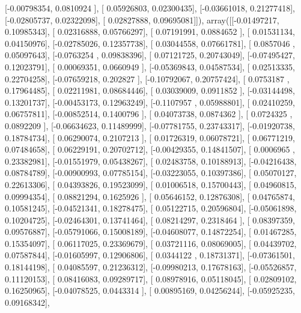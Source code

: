 \documentclass{article}
\begin{document}
       [-0.00798354,  0.0810924 ],
       [ 0.05926803,  0.02300435],
       [-0.03661018,  0.21277418],
       [-0.02805737,  0.02322098],
       [ 0.02827888,  0.09695081]]), array([[-0.01497217,  0.10985343],
       [ 0.02316888,  0.05766297],
       [ 0.07191991,  0.0884652 ],
       [ 0.01531134,  0.04150976],
       [-0.02785026,  0.12357738],
       [ 0.03044558,  0.07661781],
       [ 0.0857046 ,  0.05097643],
       [-0.0763254 ,  0.09838396],
       [ 0.07121725,  0.20743049],
       [-0.07495427,  0.12023791],
       [ 0.00069351,  0.0660949 ],
       [-0.05369843,  0.04587534],
       [ 0.02513335,  0.22704258],
       [-0.07659218,  0.202827  ],
       [-0.10792067,  0.20757424],
       [ 0.0753187 ,  0.17964485],
       [ 0.02211981,  0.08684446],
       [ 0.03039009,  0.0911852 ],
       [-0.03144498,  0.13201737],
       [-0.00453173,  0.12963249],
       [-0.1107957 ,  0.05988801],
       [ 0.02410259,  0.06757811],
       [-0.00852514,  0.1400796 ],
       [ 0.04073738,  0.0874362 ],
       [ 0.0724325 ,  0.0892209 ],
       [-0.06634623,  0.11489999],
       [-0.07781755,  0.23743317],
       [-0.01920738,  0.18784734],
       [ 0.06290074,  0.2107213 ],
       [ 0.01726319,  0.06078721],
       [ 0.06771219,  0.07484658],
       [ 0.06229191,  0.20702712],
       [-0.00429355,  0.14841507],
       [ 0.0006965 ,  0.23382981],
       [-0.01551979,  0.05438267],
       [ 0.02483758,  0.10188913],
       [-0.04216438,  0.08784789],
       [-0.00900993,  0.07785154],
       [-0.03223055,  0.10397386],
       [ 0.05070127,  0.22613306],
       [ 0.04393826,  0.19523099],
       [ 0.01006518,  0.15700443],
       [ 0.04960815,  0.09994354],
       [ 0.08821294,  0.1625926 ],
       [ 0.05646152,  0.12876308],
       [ 0.04765874,  0.10581245],
       [-0.04521341,  0.18278475],
       [ 0.05122715,  0.20596804],
       [-0.05061898,  0.10204725],
       [-0.02464301,  0.13741464],
       [ 0.08214297,  0.2318464 ],
       [ 0.08397359,  0.09576887],
       [-0.05791066,  0.15008189],
       [-0.04608077,  0.14872254],
       [ 0.01467285,  0.15354097],
       [ 0.06117025,  0.23369679],
       [ 0.03721116,  0.08069005],
       [ 0.04439702,  0.07587844],
       [-0.01605997,  0.12906806],
       [ 0.0344122 ,  0.18731371],
       [-0.07361501,  0.18144198],
       [ 0.04085597,  0.21236312],
       [-0.09980213,  0.17678163],
       [-0.05526857,  0.11120153],
       [ 0.08416083,  0.09289717],
       [ 0.08978916,  0.05118045],
       [ 0.02809102,  0.16250965],
       [-0.04078525,  0.0443314 ],
       [ 0.00895169,  0.04256244],
       [-0.05925235,  0.09168342],
\end{document}
